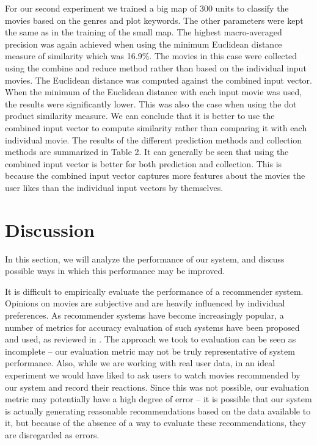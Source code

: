 \documentclass[conference]{IEEEtran}
\begin{document}
For our second experiment we trained a big map of 300 units to classify the movies based on the genres and plot keywords. The other parameters were kept the same as in the training of the small map. The highest macro-averaged precision was again achieved when using the minimum Euclidean distance measure of similarity which was 16.9\%. The movies in this case were collected using the combine and reduce method rather than based on the individual input movies. The Euclidean distance was computed against the combined input vector. When the minimum of the Euclidean distance with each input movie was used, the results were significantly lower. This was also the case when using the dot product similarity measure. We can conclude that it is better to use the combined input vector to compute similarity rather than comparing it with each individual movie. The results of the different prediction methods and collection methods are summarized in Table 2. It can generally be seen that using the combined input vector is better for both prediction and collection. This is because the combined input vector captures more features about the movies the user likes than the individual input vectors by themselves.


\section{Discussion}
In this section, we will analyze the performance of our system, and discuss possible ways in which this performance may be improved.

It is difficult to empirically evaluate the performance of a recommender system. Opinions on movies are subjective and are heavily influenced by individual preferences. As recommender systems have become increasingly popular, a number of metrics for accuracy evaluation of such systems have been proposed and used, as reviewed in \cite{gunawardana2009survey}. The approach we took to evaluation can be seen as incomplete – our evaluation metric may not be truly representative of system performance. Also, while we are working with real user data, in an ideal experiment we would have liked to ask users to watch movies recommended by our system and record their reactions. Since this was not possible, our evaluation metric may potentially have a high degree of error – it is possible that our system is actually generating reasonable recommendations based on the data available to it, but because of the absence of a way to evaluate these recommendations, they are disregarded as errors.
\end{document}
